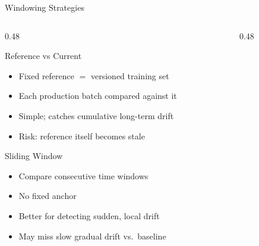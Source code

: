 \documentclass[10pt,aspectratio=169]{beamer}
\begin{document}
\begin{frame}{Windowing Strategies}
  \begin{columns}[T]
    \begin{column}{0.48\textwidth}
      \begin{block}{Reference vs Current}
        \begin{itemize}
          \item Fixed reference $=$ versioned training set
          \item Each production batch compared against it
          \item Simple; catches cumulative long-term drift
          \item Risk: reference itself becomes stale
        \end{itemize}
      \end{block}
      \vspace{0.2cm}
      \begin{block}{Sliding Window}
        \begin{itemize}
          \item Compare consecutive time windows
          \item No fixed anchor
          \item Better for detecting sudden, local drift
          \item May miss slow gradual drift vs.\ baseline
        \end{itemize}
      \end{block}
    \end{column}
    \begin{column}{0.48\textwidth}
\end{column}
\end{columns}
\end{frame}
\end{document}

